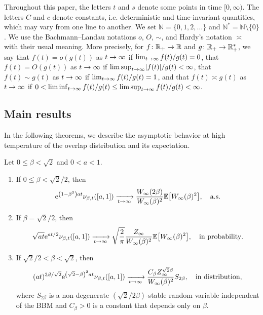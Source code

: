 \documentclass[AHL,Unicode,longabstracts,published]{cedram}
\newcommand{\e}{\mathrm{e}}
\newcommand{\N}{\mathbb{N}}
\newcommand{\R}{\mathbb{R}}
\newcommand\1{\mathds{1}}
\newcommand{\Expec}[1]{\mathbb{E}\left[#1\right]}
\newcommand{\abs}[1]{\left\lvert#1\right\rvert}
\newcommand*{\relabel}{\renewcommand{\labelenumi}{(\theenumi)}}
\newcommand*{\romanenumi}{\renewcommand*{\theenumi}{\roman{enumi}}\relabel}
\let\originalleft\left
\let\originalright\right
\renewcommand{\left}{\mathopen{}\mathclose\bgroup\originalleft}
\renewcommand{\right}{\aftergroup\egroup\originalright}
\renewcommand*{\to}{\mathchoice{\longrightarrow}{\rightarrow}{\rightarrow}{\rightarrow}}
\begin{document}
Throughout this paper, the letters $t$ and $s$ denote some points in time $[0, \infty)$. The letters $C$ and $c$ denote constants, i.e. deterministic and time-invariant quantities, which may vary from one line to another. We set $\N = \{0,1,2,\dots\}$ and $\N^* = \N \setminus \{0\}$. We use the Bachmann--Landau notations $o$, $O$, $\sim$, and Hardy's notation $\asymp$ with their usual meaning. More precisely, for $f \colon \R_+ \to \R$ and $g \colon \R_+ \to \R_+^*$, we say that $f(t) = o(g(t))$ as $t \to \infty$ if $\lim_{t\to\infty} f(t)/g(t) = 0$, that $f(t) = O(g(t))$ as $t \to \infty$ if $\limsup_{t\to\infty} \abs{f(t)}/g(t) < \infty$, that $f(t) \sim g(t)$ as $t \to \infty$ if $\lim_{t\to\infty} f(t)/g(t) = 1$, and that $f(t) \asymp g(t)$ as $t \to \infty$ if $0 < \liminf_{t\to\infty} f(t)/g(t) \leq \limsup_{t\to\infty} f(t)/g(t) < \infty$.

\subsection{Main results}

In the following theorems, we describe the asymptotic behavior at high temperature of the overlap distribution and its expectation.

\begin{theo}\label{thm:asymptotics_of_the_overlap_distribution}
Let $0 \leq \beta < \sqrt{2}$ and $0 < a < 1$.
\begin{enumerate}\romanenumi
\item\label{it:asymptotics_of_the_overlap_distribution_1}
If $0 \leq \beta < \sqrt{2}/2$, then
\begin{equation*}
\e^{\left(1 - \beta^2\right)at} \nu_{\beta, t}([a, 1]) \xrightarrow[t \to \infty]{} \frac{W_\infty(2\beta)}{W_\infty(\beta)^2} \Expec{W_\infty(\beta)^2}, \quad \text{a.s.}
\end{equation*}
\item\label{it:asymptotics_of_the_overlap_distribution_2}
If $\beta = \sqrt{2}/2$, then
\begin{equation*}
\sqrt{at} \e^{at/2} \nu_{\beta, t}([a, 1]) \xrightarrow[t \to \infty]{} \sqrt{\frac{2}{\pi}} \frac{Z_\infty}{W_\infty(\beta)^2} \Expec{W_\infty(\beta)^2}, \quad \text{in probability}.
\end{equation*}
\item\label{it:asymptotics_of_the_overlap_distribution_3}
If $\sqrt{2}/2 < \beta < \sqrt{2}$, then
\begin{equation*}
(at)^{3 \beta/\sqrt{2}} \e^{\left(\sqrt{2} - \beta\right)^2 at} \nu_{\beta, t}([a, 1]) \xrightarrow[t \to \infty]{} \frac{C_\beta Z_\infty^{\sqrt{2}\beta}}{W_\infty(\beta)^2} S_{2\beta}, \quad \text{in distribution},
\end{equation*}
where $S_{2\beta}$ is a non-degenerate $(\sqrt{2}/2\beta)$-stable random variable independent of the BBM and $C_\beta > 0$ is a constant that depends only on $\beta$.
\end{enumerate}
\end{theo}
\end{document}

